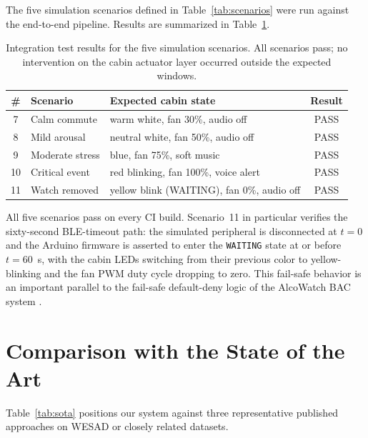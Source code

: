 The five simulation scenarios defined in Table~\ref{tab:scenarios}
were run against the end-to-end pipeline. Results are summarized in
Table~\ref{tab:integration}.

\begin{table}[H]
\centering
\caption{Integration test results for the five simulation scenarios.
All scenarios pass; no intervention on the cabin actuator layer
occurred outside the expected windows.}
\label{tab:integration}
\small
\begin{tabular}{clp{6cm}c}
\toprule
\textbf{\#} & \textbf{Scenario} & \textbf{Expected cabin state} &
\textbf{Result} \\
\midrule
7  & Calm commute    & warm white, fan 30\%, audio off           & PASS \\
8  & Mild arousal    & neutral white, fan 50\%, audio off        & PASS \\
9  & Moderate stress & blue, fan 75\%, soft music               & PASS \\
10 & Critical event  & red blinking, fan 100\%, voice alert      & PASS \\
11 & Watch removed   & yellow blink (WAITING), fan 0\%, audio off& PASS \\
\bottomrule
\end{tabular}
\end{table}

All five scenarios pass on every CI build. Scenario~11 in particular
verifies the sixty-second BLE-timeout path: the simulated peripheral
is disconnected at $t=0$ and the Arduino firmware is asserted to
enter the \texttt{WAITING} state at or before $t=60$~s, with the
cabin LEDs switching from their previous color to yellow-blinking
and the fan PWM duty cycle dropping to zero. This fail-safe behavior
is an important parallel to the fail-safe default-deny logic of the
AlcoWatch BAC system \citep{acn1408}.

\section{Comparison with the State of the Art}
\label{sec:r-sota}

Table~\ref{tab:sota} positions our system against three representative
published approaches on WESAD or closely related datasets.

